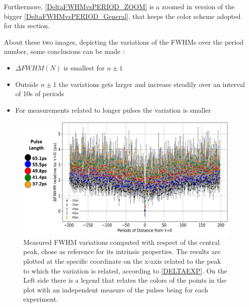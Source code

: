 Furthermore, \autoref{DeltaFWHMvsPERIOD_ZOOM} is a zoomed in version of the bigger \autoref{DeltaFWHMvsPERIOD_General}, that keeps the color scheme adopted for this section.

About these two images, depicting the variations of the FWHMs over the period number, some conclusions can be made :

\begin{itemize}
\item $\Delta FWHM(N)$ is smallest for $n \pm 1$
\item Outside $n \pm 1$ the variations gets larger and increase steadily over an interval of 10s of periods
\item For measurements related to longer pulses the variation is smaller	
\end{itemize}



\begin{figure}[hbtp]
\centering
\includegraphics[width=1\textwidth]{DeltaFWHMvsPeriods.jpg}
\caption{Measured FWHM variations computed with respect of the central peak, chose as reference for its intrinsic properties. The results are plotted at the specific coordinate on the x-axis related to the peak to which the variation is related, according to \autoref{DELTAEXP}. On the Left side there is a legend that relates the colors of the points in the plot with an independent measure of the pulses being for each experiment.}
\label{DeltaFWHMvsPERIOD_General}
\end{figure}

